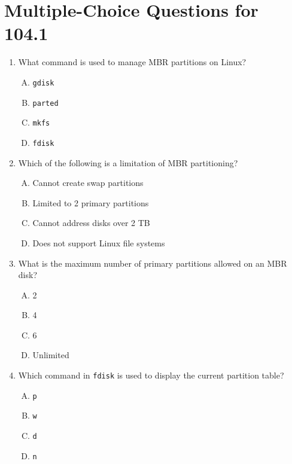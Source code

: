 \documentclass[a4paper]{report}
\begin{document}
\newpage
\section*{Multiple-Choice Questions for 104.1}
\begin{enumerate}[1.]

    \item What command is used to manage MBR partitions on Linux?  
    \begin{enumerate}[A)]
        \item \texttt{gdisk}  
        \item \texttt{parted}  
        \item \texttt{mkfs}  
        \item \texttt{fdisk}  
    \end{enumerate}

    \item Which of the following is a limitation of MBR partitioning?  
    \begin{enumerate}[A)]
        \item Cannot create swap partitions  
        \item Limited to 2 primary partitions  
        \item Cannot address disks over 2 TB  
        \item Does not support Linux file systems  
    \end{enumerate}

    \item What is the maximum number of primary partitions allowed on an MBR disk?  
    \begin{enumerate}[A)]
        \item 2  
        \item 4  
        \item 6  
        \item Unlimited  
    \end{enumerate}

    \item Which command in \texttt{fdisk} is used to display the current partition table?  
    \begin{enumerate}[A)]
        \item \texttt{p}  
        \item \texttt{w}  
        \item \texttt{d}  
        \item \texttt{n}  
    \end{enumerate}


\end{enumerate}
\end{document}
